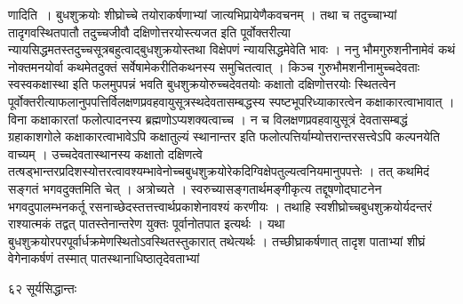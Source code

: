 \documentclass[11pt, openany]{book}
\begin{document}
\begin{sloppypar}
\noindent णादिति~। बुधशुक्रयोः शीघ्रोच्चे तयोराकर्षणाभ्यां जात्यभिप्रायेणैकवचनम् । तथा च तदुच्चाभ्यां तादृगवस्थितपातौ तदुच्चजीवौ दक्षिणोत्तरयोस्त्यजत इति पूर्वोक्तरीत्या न्यायसिद्धमतस्तदुच्चसूत्रबहुत्वाद्बुधशुक्रयोस्तथा विक्षेपणं न्यायसिद्धमेवेति भावः । ननु भौमगुरुशनीनामेवं कथं नोक्तमनयोर्वा कथमेतदुक्तं सर्वेषामेकरीतिकथनस्य समुचितत्वात् । किञ्च गुरुभौमशनीनामुच्चदेवताः स्वस्वकक्षास्था इति फलमुपपन्नं भवति बुधशुक्रयोरुच्चदेवतयोः कक्षातो दक्षिणोत्तरयोः स्थितत्वेन पूर्वोक्तरीत्याफलानुपपत्तिर्विलक्षणप्रवहवायुसूत्रस्थदेवतासम्बद्धस्य स्पष्टभूपरिध्याकारत्वेन कक्षाकारत्वाभावात् । विना कक्षाकारतां फलोत्पादनस्य ब्रह्मणोऽप्यशक्यत्वाच्च । न च विलक्षणप्रवहवायुसूत्रं देवतासम्बद्धं ग्रहाकाशगोले कक्षाकारत्वाभावेऽपि कक्षातुल्यं स्थानान्तर इति फलोत्पत्तिर्याम्योत्तरान्तरसत्त्वेऽपि कल्पनयेति वाच्यम् । उच्चदेवतास्थानस्य कक्षातो दक्षिणत्वे तत्षड्भान्तरप्रदिशस्योत्तरत्वावश्यम्भावेनोच्चबुधशुक्रयोरेकदिग्विक्षेपतुल्यत्वनियमानुपपत्तेः । तत् कथमिदं सङ्गतं भगवदुक्तमिति चेत् । अत्रोच्यते । स्वरुच्यासङ्गतार्थमङ्गीकृत्य तद्दूषणोद्घाटनेन भगवदुपालम्भनकर्तू रसनाच्छेदस्तत्तत्त्वार्थप्रकाशेनावश्यं करणीयः । तथाहि स्वशीघ्रोच्चबुधशुक्रयोर्यदन्तरं राश्यात्मकं तद्वत् पातस्तेनान्तरेण युक्तः पूर्वानोतपात इत्यर्थः । यथा बुधशुक्रयोरपरपूर्वार्धक्रमेणस्थितोऽवस्थितस्तुकारात् तथेत्यर्थः । तच्छीघ्राकर्षणात् तादृश पाताभ्यां शीघ्रं वेगेनाकर्षणं तस्मात् पातस्थानाधिष्ठातृदेवताभ्यां
\end{sloppypar}

\newpage

\noindent६२ \hspace{4cm} सूर्यसिद्धान्तः
\vspace{1cm}
\end{document}
